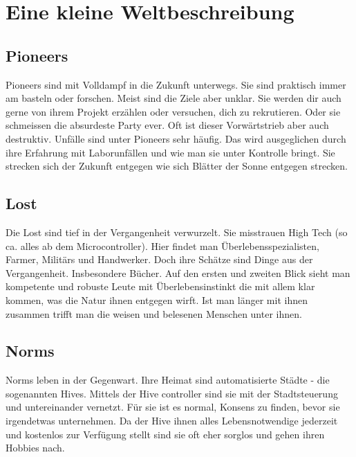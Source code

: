 
\chapter{Eine kleine Weltbeschreibung}


\section{Pioneers}
\label{sec:Pioneers}

Pioneers sind mit Volldampf in die Zukunft unterwegs. Sie sind praktisch immer am basteln oder forschen. Meist sind die Ziele aber unklar. Sie werden dir auch gerne von ihrem Projekt erzählen oder versuchen, dich zu rekrutieren. Oder sie schmeissen die absurdeste Party ever.
Oft ist dieser Vorwärtstrieb aber auch destruktiv. Unfälle sind unter Pioneers sehr häufig. Das wird ausgeglichen durch ihre Erfahrung mit Laborunfällen und wie man sie unter Kontrolle bringt.
Sie strecken sich der Zukunft entgegen wie sich Blätter der Sonne entgegen strecken.

\section{Lost}
\label{sec:Lost}

Die Lost sind tief in der Vergangenheit verwurzelt. Sie misstrauen High Tech (so ca. alles ab dem Microcontroller). Hier findet man Überlebensspezialisten, Farmer, Militärs und Handwerker. Doch ihre Schätze sind Dinge aus der Vergangenheit. Insbesondere Bücher.
Auf den ersten und zweiten Blick sieht man kompetente und robuste Leute mit Überlebensinstinkt die mit allem klar kommen, was die Natur ihnen entgegen wirft. Ist man länger mit ihnen zusammen trifft man die weisen und belesenen Menschen unter ihnen.

\section{Norms}
\label{sec:Norms}

Norms leben in der Gegenwart. Ihre Heimat sind automatisierte Städte - die sogenannten Hives. Mittels der Hive controller sind sie mit der Stadtsteuerung und untereinander vernetzt. Für sie ist es normal, Konsens zu finden, bevor sie irgendetwas unternehmen. Da der Hive ihnen alles Lebensnotwendige jederzeit und kostenlos zur Verfügung stellt sind sie oft eher sorglos und gehen ihren Hobbies nach.

